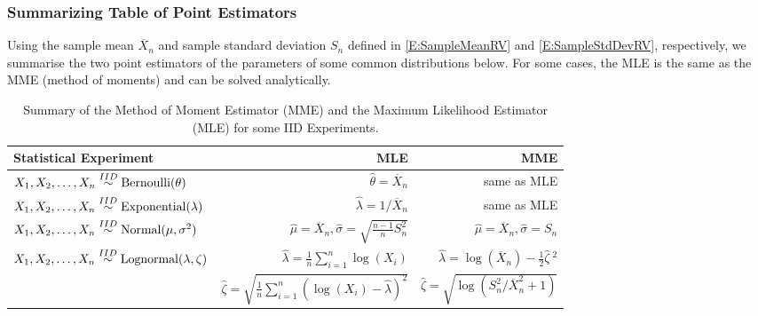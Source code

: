 \subsubsection*{Summarizing Table of Point Estimators}
Using the sample mean $\overline{X}_n$ and sample standard deviation $S_n$ defined in \eqref{E:SampleMeanRV} and \eqref{E:SampleStdDevRV}, respectively, we summarise the two point estimators of the parameters of some common distributions below.  For some cases, the MLE is the same as the MME (method of moments) and can be solved analytically.
\begin{center}
\begin{table}[htbp]
\caption{Summary of the Method of Moment Estimator (MME) and the Maximum Likelihood Estimator (MLE) for some IID Experiments. \label{T:MMEMLE}}
\begin{tabular}{l | r | r}
\hline
Statistical Experiment & MLE & MME \\ \hline
$X_1,X_2,\ldots,X_n \overset{IID}{\sim} \mbox{{\rm Bernoulli}}(\theta)$ & $\widehat{\theta}=\overline{X}_n$ & same as MLE \\ \hline
$X_1,X_2,\ldots,X_n \overset{IID}{\sim} \mbox{{\rm Exponential}}(\lambda)$ & $\widehat{\lambda}={1}/{\overline{X}_n} $ & same as MLE \\ \hline
$X_1,X_2,\ldots,X_n \overset{IID}{\sim} \mbox{{\rm Normal}}(\mu,\sigma^2)$ & $\widehat{\mu}=\overline{X}_n, \widehat{\sigma} = \sqrt{\frac{n-1}{n}S^2_n} $ & $\widehat{\mu}=\overline{X}_n, \widehat{\sigma} = S_n $ \\ \hline
$X_1,X_2,\ldots,X_n \overset{IID}{\sim} \mbox{{\rm Lognormal}}(\lambda,\zeta)$ & $\widehat{\lambda}=\frac{1}{n}{\sum_{i=1}^n \log(X_i)} $ & $\widehat{\lambda} = \log(\overline{X}_n) - \frac{1}{2} {\widehat{\zeta}} \ ^2$ \\ %
 & $\widehat{\zeta} = \sqrt{\frac{1}{n} \sum_{i=1}^n{(\log(X_i)-\widehat{\lambda})^2}} $ & $\widehat{\zeta} = \sqrt{\log \left({S_n^2}/{\overline{X}_n^2} +1 \right)}$ \\
\hline
\end{tabular}
\end{table}
\end{center}

